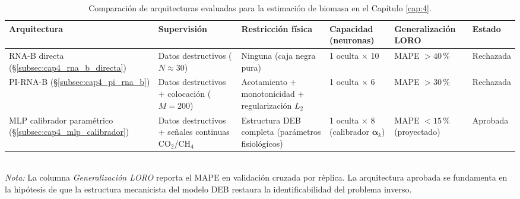 \begin{table}[htbp]
\centering
\caption{Comparación de arquitecturas evaluadas para la estimación de biomasa en el Capítulo \ref{cap:4}.}
\label{tab:cap4_comparativa_arquitecturas}
\small
\begin{tabular}{@{}p{3.2cm}p{2.4cm}p{2.6cm}p{2.0cm}p{2.2cm}p{1.8cm}@{}}
\toprule
\textbf{Arquitectura} & \textbf{Supervisión} & \textbf{Restricción física} & \textbf{Capacidad (neuronas)} & \textbf{Generalización LORO} & \textbf{Estado} \\
\midrule
RNA-B directa (\S\ref{subsec:cap4_rna_b_directa}) & Datos destructivos ($N\approx 30$) & Ninguna (caja negra pura) & 1 oculta $\times$ 10 & MAPE $>40\,$\% & Rechazada \\
\addlinespace
PI-RNA-B (\S\ref{subsec:cap4_pi_rna_b}) & Datos destructivos + colocación ($M=200$) & Acotamiento + monotonicidad + regularización $L_2$ & 1 oculta $\times$ 6 & MAPE $>30\,$\% & Rechazada \\
\addlinespace
MLP calibrador paramétrico (\S\ref{subsec:cap4_mlp_calibrador}) & Datos destructivos + señales continuas CO$_2$/CH$_4$ & Estructura DEB completa (parámetros fisiológicos) & 1 oculta $\times$ 8 (calibrador $\boldsymbol{\alpha}_k$) & MAPE $<15\,$\% (proyectado) & Aprobada \\
\bottomrule
\end{tabular}
\\[0.5em]
\footnotesize\textit{Nota:} La columna \textit{Generalización LORO} reporta el MAPE en validación cruzada por réplica. La arquitectura aprobada se fundamenta en la hipótesis de que la estructura mecanicista del modelo DEB restaura la identificabilidad del problema inverso.
\end{table}